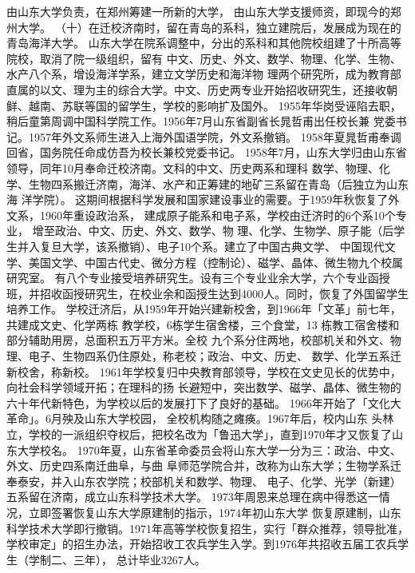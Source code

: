 \documentclass[openany]{sduthesis} %
\begin{document}
由山东大学负责，在郑州筹建一所新的大学， 由山东大学支援师资，即现今的郑州大学。 （十）在迁校济南时，留在青岛的系科，独立建院后，发展成为现在的青岛海洋大学。 山东大学在院系调整中，分出的系科和其他院校组建了十所高等院校，取消了院一级组织，留有 中文、历史、外文、数学、物理、化学、生物、水产八个系，增设海洋学系，建立文学历史和海洋物 理两个研究所，成为教育部直属的以文、理为主的综合大学。中文、历史两专业开始招收研究生，还接收朝鲜、越南、苏联等国的留学生，学校的影响扩及国外。 1955年华岗受诬陷去职，稍后童第周调中国科学院工作。1956年7月山东省副省长晁哲甫出任校长兼 党委书记。1957年外文系师生进入上海外国语学院，外文系撤销。 1958年夏晁哲甫奉调回省，国务院任命成仿吾为校长兼校党委书记。 1958年7月，山东大学归由山东省领导，同年10月奉命迁校济南。文科的中文、历史两系和理科 数学、物理、化学、生物四系搬迁济南，海洋、水产和正筹建的地矿三系留在青岛（后独立为山东海 洋学院）。 这期间根据科学发展和国家建设事业的需要。于1959年秋恢复了外文系，1960年重设政治系， 建成原子能系和电子系，学校由迁济时的6个系10个专业， 增至政治、中文、历史、外文、数学、物 理、化学、生物学、原子能（后学生并入复旦大学，该系撤销）、电子10个系。建立了中国古典文学、 中国现代文学、美国文学、中国古代史、微分方程（控制论）、磁学、晶体、微生物九个校属研究室。 有八个专业接受培养研究生。设有三个专业业余大学，六个专业函授班，并招收函授研究生，在校业余和函授生达到4000人。同时，恢复了外国留学生培养工作。 学校迁济后，从1959年开始兴建新校舍，到1966年「文革」前七年，共建成文史、化学两栋 教学校，6栋学生宿舍楼，三个食堂，13 栋教工宿舍楼和部分辅助用房，总面积五万平方米。全校 九个系分住两地，校部机关和外文、物理、电子、生物四系仍住原处，称老校；政治、中文、历史、 数学、化学五系迁新校舍，称新校。 1961年学校复归中央教育部领导，学校在文史见长的优势中，向社会科学领域开拓；在理科的扬 长避短中，突出数学、磁学、晶体、微生物的六十年代新特色，为学校以后的发展打下了良好的基础。 1966年开始了「文化大革命」。6月殃及山东大学校园， 全校机构随之瘫痪。1967年后，校内山东 头林立，学校的一派组织夺权后，把校名改为「鲁迅大学」，直到1970年才又恢复了山东大学校名。 1970年夏，山东省革命委员会将山东大学一分为三：政治、中文、外文、历史四系南迁曲阜，与曲 阜师范学院合并，改称为山东大学；生物学系迁奉泰安，并入山东农学院；校部机关和数学、物理、 电子、化学、光学（新建）五系留在济南，成立山东科学技术大学。 1973年周恩来总理在病中得悉这一情况，立即签署恢复山东大学原建制的指示，1974年初山东大学 恢复原建制，山东科学技术大学即行撤销。1971年高等学校恢复招生，实行「群众推荐，领导批准， 学校审定」的招生办法，开始招收工农兵学生入学。到1976年共招收五届工农兵学生（学制二、三年）， 总计毕业3267人。
\end{document}
